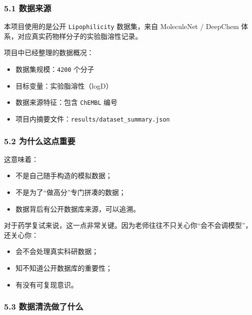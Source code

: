 \documentclass[
  ,
]{ctexart}
\providecommand{\tightlist}{%
  \setlength{\itemsep}{0pt}\setlength{\parskip}{0pt}}
\begin{document}
\hypertarget{ux6570ux636eux6765ux6e90}{%
\subsubsection{5.1 数据来源}\label{ux6570ux636eux6765ux6e90}}

本项目使用的是公开 \texttt{Lipophilicity} 数据集，来自 MoleculeNet /
DeepChem 体系，对应真实药物样分子的实验脂溶性记录。

项目中已经整理的数据概况：

\begin{itemize}
\tightlist
\item
  数据集规模：\texttt{4200} 个分子
\item
  目标变量：实验脂溶性（logD）
\item
  数据来源特征：包含 \texttt{ChEMBL} 编号
\item
  项目内摘要文件：\texttt{results/dataset\_summary.json}
\end{itemize}

\hypertarget{ux4e3aux4ec0ux4e48ux8fd9ux70b9ux91cdux8981}{%
\subsubsection{5.2
为什么这点重要}\label{ux4e3aux4ec0ux4e48ux8fd9ux70b9ux91cdux8981}}

这意味着：

\begin{itemize}
\tightlist
\item
  不是自己随手构造的模拟数据；
\item
  不是为了``做高分''专门拼凑的数据；
\item
  数据背后有公开数据库来源，可以追溯。
\end{itemize}

对于药学复试来说，这一点非常关键。因为老师往往不只关心你``会不会调模型''，还关心你：

\begin{itemize}
\tightlist
\item
  会不会处理真实科研数据；
\item
  知不知道公开数据库的重要性；
\item
  有没有可复现意识。
\end{itemize}

\hypertarget{ux6570ux636eux6e05ux6d17ux505aux4e86ux4ec0ux4e48}{%
\subsubsection{5.3
数据清洗做了什么}\label{ux6570ux636eux6e05ux6d17ux505aux4e86ux4ec0ux4e48}}
\end{document}

